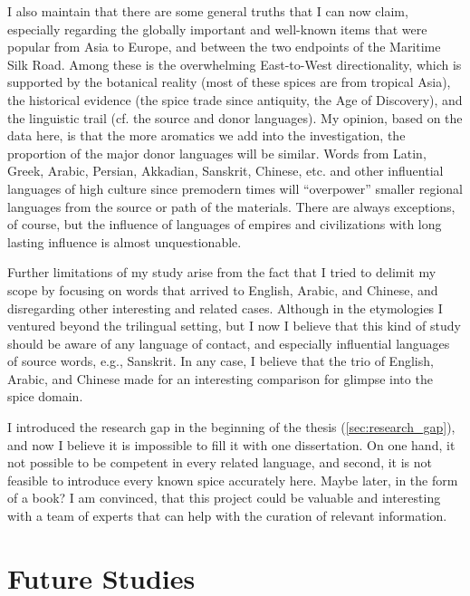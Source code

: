 I also maintain that there are some general truths that I can now claim, especially regarding the globally important and well-known items that were popular from Asia to Europe, and between the two endpoints of the Maritime Silk Road. Among these is the overwhelming East-to-West directionality, which is supported by the botanical reality (most of these spices are from tropical Asia), the historical evidence (the spice trade since antiquity, the Age of Discovery), and the linguistic trail (cf. the source and donor languages). My opinion, based on the data here, is that the more aromatics we add into the investigation, the proportion of the major donor languages will be similar. Words from Latin, Greek, Arabic, Persian, Akkadian, Sanskrit, Chinese, etc. and other influential languages of high culture since premodern times will ``overpower'' smaller regional languages from the source or path of the materials. There are always exceptions, of course, but the influence of languages of empires and civilizations with long lasting influence is almost unquestionable.

Further limitations of my study arise from the fact that I tried to delimit my scope by focusing on words that arrived to English, Arabic, and Chinese, and disregarding other interesting and related cases. Although in the etymologies I ventured beyond the trilingual setting, but I now I believe that this kind of study should be aware of any language of contact, and especially influential languages of source words, e.g., Sanskrit. In any case, I believe that the trio of English, Arabic, and Chinese made for an interesting comparison for glimpse into the spice domain.


I introduced the research gap in the beginning of the thesis (\cref{sec:research_gap}), and now I believe it is impossible to fill it with one dissertation. On one hand, it not possible to be competent in every related language, and second, it is not feasible to introduce every known spice accurately here. Maybe later, in the form of a book? I am convinced, that this project could be valuable and interesting with a team of experts that can help with the curation of relevant information.

\section{Future Studies}
\label{sec:future_studies}

